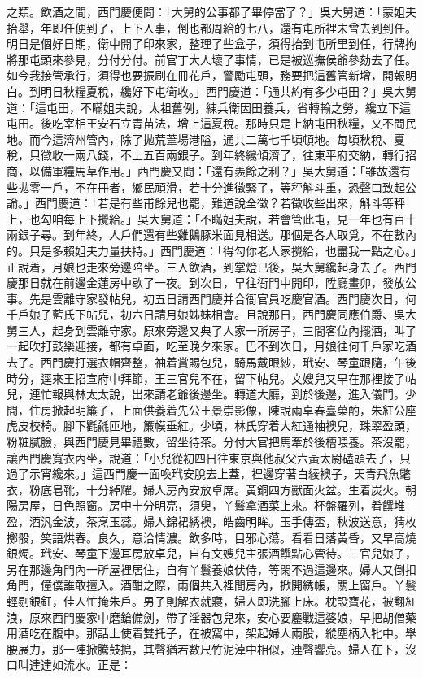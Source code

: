 \begin{showcontents}{}
之類。飲酒之間，西門慶便問：「大舅的公事都了畢停當了？」吳大舅道：「蒙姐夫抬舉，年即任便到了，上下人事，倒也都周給的七八，還有屯所裡未曾去到到任。明日是個好日期，衛中開了印來家，整理了些盒子，須得抬到屯所里到任，行牌拘將那屯頭來參見，分付分付。前官丁大人壞了事情，已是被巡撫侯爺參劾去了任。如今我接管承行，須得也要振刷在冊花戶，警勵屯頭，務要把這舊管新增，開報明白。到明日秋糧夏稅，纔好下屯衛收。」西門慶道：「通共約有多少屯田？」吳大舅道：「這屯田，不瞞姐夫說，太祖舊例，練兵衛因田養兵，省轉輸之勞，纔立下這屯田。後吃宰相王安石立青苗法，增上這夏稅。那時只是上納屯田秋糧，又不問民地。而今這濟州管內，除了拋荒葦場港隘，通共二萬七千頃頓地。每頃秋稅、夏稅，只徵收一兩八錢，不上五百兩銀子。到年終纔傾濟了，往東平府交納，轉行招商，以備軍糧馬草作用。」西門慶又問：「還有羨餘之利？」吳大舅道：「雖故還有些拋零一戶，不在冊者，鄉民頑滑，若十分進徵緊了，等秤斛斗重，恐聲口致起公論。」西門慶道：「若是有些甫餘兒也罷，難道說全徵？若徵收些出來，斛斗等秤上，也勾咱每上下攪給。」吳大舅道：「不瞞姐夫說，若會管此屯，見一年也有百十兩銀子尋。到年終，人戶們還有些雞鵝豚米面見相送。那個是各人取覓，不在數內的。只是多賴姐夫力量扶持。」西門慶道：「得勾你老人家攪給，也盡我一點之心。」正說着，月娘也走來旁邊陪坐。三人飲酒，到掌燈已後，吳大舅纔起身去了。西門慶那日就在前邊金蓮房中歇了一夜。到次日，早往衙門中開印，陞廳畫卯，發放公事。先是雲離守家發帖兒，初五日請西門慶并合衙官員吃慶官酒。西門慶次日，何千戶娘子藍氏下帖兒，初六日請月娘姊妹相會。且說那日，西門慶同應伯爵、吳大舅三人，起身到雲離守家。原來旁邊又典了人家一所房子，三間客位內擺酒，叫了一起吹打鼓樂迎接，都有卓面，吃至晚夕來家。巴不到次日，月娘往何千戶家吃酒去了。西門慶打選衣帽齊整，袖着賞賜包兒，騎馬戴眼紗，玳安、琴童跟隨，午後時分，逕來王招宣府中拜節，王三官兒不在，留下帖兒。文嫂兒又早在那裡接了帖兒，連忙報與林太太說，出來請老爺後邊坐。轉道大廳，到於後邊，進入儀門。少間，住房掀起明簾子，上面供養着先公王景崇影像，陳說兩卓春臺菓酌，朱紅公座虎皮校椅。腳下氍毹匝地，簾幙垂紅。少頃，林氏穿着大紅通袖襖兒，珠翠盈頭，粉粧膩臉，與西門慶見畢禮數，留坐待茶。分付大官把馬牽於後槽喂養。茶沒罷，讓西門慶寬衣內坐，說道：「小兒從初四日往東京與他叔父六黃太尉磕頭去了，只過了示宵纔來。」這西門慶一面喚玳安脫去上蓋，裡邊穿著白綾襖子，天青飛魚氅衣，粉底皂靴，十分綽耀。婦人房內安放卓席。黃銅四方獸面火盆。生着炭火。朝陽房屋，日色照窗。房中十分明亮，須臾，丫鬟拿酒菜上來。杯盤羅列，肴饌堆盈，酒汎金波，茶烹玉蕊。婦人錦裙綉襖，皓齒明眸。玉手傳盃，秋波送意，猜枚擲骰，笑語烘春。良久，意洽情濃。飲多時，目邪心蕩。看看日落黃昏，又早高燒銀燭。玳安、琴童下邊耳房放卓兒，自有文嫂兒主張酒饌點心管待。三官兒娘子，另在那邊角門內一所屋裡居住，自有丫鬟養娘伏侍，等閑不過這邊來。婦人又倒扣角門，僮僕誰敢擅入。酒酣之際，兩個共入裡間房內，掀開綉帳，關上窗戶。丫鬟輕剔銀釭，佳人忙掩朱戶。男子則解衣就寢，婦人即洗腳上床。枕設寶花，被翻紅浪，原來西門慶家中磨鎗備劍，帶了淫器包兒來，安心要鏖戰這婆娘，早把胡僧藥用酒吃在腹中。那話上使着雙托子，在被窩中，架起婦人兩股，縱塵柄入牝中。舉腰展力，那一陣掀騰鼓搗，其聲猶若數尺竹泥淖中相似，連聲響亮。婦人在下，沒口叫達達如流水。正是：


\end{showcontents}
